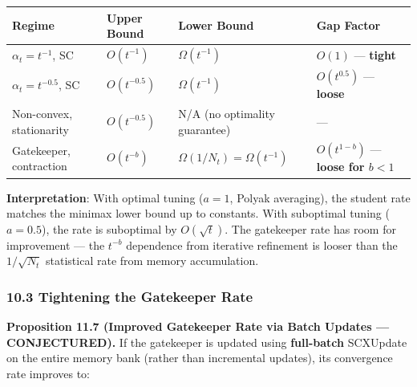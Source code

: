 \documentclass[
  12pt,
]{article}
\begin{document}
\begin{longtable}[]{@{}
  >{\raggedright\arraybackslash}p{}
  >{\raggedright\arraybackslash}p{}
  >{\raggedright\arraybackslash}p{}
  >{\raggedright\arraybackslash}p{}@{}}
\toprule\noalign{}
\begin{minipage}[b]{\linewidth}\raggedright
Regime
\end{minipage} & \begin{minipage}[b]{\linewidth}\raggedright
Upper Bound
\end{minipage} & \begin{minipage}[b]{\linewidth}\raggedright
Lower Bound
\end{minipage} & \begin{minipage}[b]{\linewidth}\raggedright
Gap Factor
\end{minipage} \\
\midrule\noalign{}
\endhead
\bottomrule\noalign{}
\endlastfoot
\(\alpha_t = t^{-1}\), SC & \(O(t^{-1})\) & \(\Omega(t^{-1})\) &
\(O(1)\) --- \textbf{tight} \\
\(\alpha_t = t^{-0.5}\), SC & \(O(t^{-0.5})\) & \(\Omega(t^{-1})\) &
\(O(t^{0.5})\) --- \textbf{loose} \\
Non-convex, stationarity & \(O(t^{-0.5})\) & N/A (no optimality
guarantee) & --- \\
Gatekeeper, contraction & \(O(t^{-b})\) &
\(\Omega(1/N_t) = \Omega(t^{-1})\) & \(O(t^{1-b})\) --- \textbf{loose
for \(b < 1\)} \\
\end{longtable}

\textbf{Interpretation}: With optimal tuning (\(a = 1\), Polyak
averaging), the student rate matches the minimax lower bound up to
constants. With suboptimal tuning (\(a = 0.5\)), the rate is suboptimal
by \(O(\sqrt{t})\). The gatekeeper rate has room for improvement --- the
\(t^{-b}\) dependence from iterative refinement is looser than the
\(1/\sqrt{N_t}\) statistical rate from memory accumulation.

\subsubsection{10.3 Tightening the Gatekeeper
Rate}\label{tightening-the-gatekeeper-rate}

\textbf{Proposition 11.7 (Improved Gatekeeper Rate via Batch Updates ---
CONJECTURED).} If the gatekeeper is updated using \textbf{full-batch}
SCXUpdate on the entire memory bank (rather than incremental updates),
its convergence rate improves to:
\end{document}
